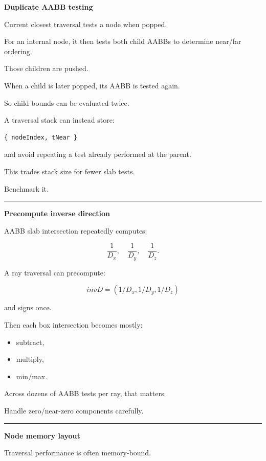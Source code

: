 \textbf{Duplicate AABB testing}

Current closest traversal tests a node when popped.

For an internal node, it then tests both child AABBs to determine near/far ordering.

Those children are pushed.

When a child is later popped, its AABB is tested again.

So child bounds can be evaluated twice.

A traversal stack can instead store:

\begin{verbatim}
{ nodeIndex, tNear }
\end{verbatim}

and avoid repeating a test already performed at the parent.

This trades stack size for fewer slab tests.

Benchmark it.

\begin{center}\rule{0.5\linewidth}{0.5pt}\end{center}

\textbf{Precompute inverse direction}

AABB slab intersection repeatedly computes:

\[
\frac1{D_x},
\quad
\frac1{D_y},
\quad
\frac1{D_z}.
\]

A ray traversal can precompute:

\[
\boxed{
invD=
(1/D_x,1/D_y,1/D_z)
}
\]

and signs once.

Then each box intersection becomes mostly:

\begin{itemize}
\tightlist
\item
  subtract,
\item
  multiply,
\item
  min/max.
\end{itemize}

Across dozens of AABB tests per ray, that matters.

Handle zero/near-zero components carefully.

\begin{center}\rule{0.5\linewidth}{0.5pt}\end{center}

\textbf{Node memory layout}

Traversal performance is often memory-bound.


